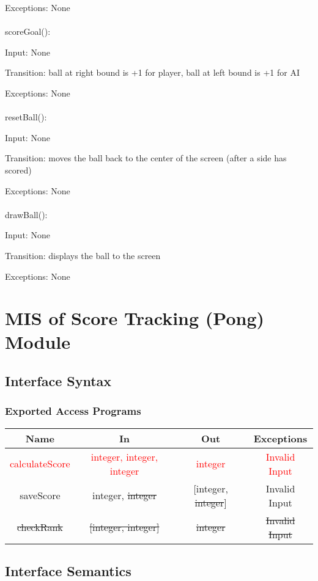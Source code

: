 \documentclass[12pt, titlepage]{article}
\begin{document}
		Exceptions: None\\	
		\\
		scoreGoal():
		
		Input: None
		
		Transition: ball at right bound is +1 for player, ball at left bound is +1 for AI
		
		Exceptions: None\\
		\\
		resetBall():
		
		Input: None
		
		Transition: moves the ball back to the center of the screen (after a side has scored)
		
		Exceptions: None\\
		\\
		drawBall():
	    
		Input: None
		
		Transition: displays the ball to the screen
		
		Exceptions: None

\section{MIS of Score Tracking (Pong) Module}
		\subsection{Interface Syntax}
		\subsubsection{Exported Access Programs}
		\begin{tabular}[pos]{|c|c|c|c|}
			\hline
			\textbf{Name}& \textbf{In} & \textbf{Out} & \textbf{Exceptions} \\ \hline
			\textcolor{red}{calculateScore} & \textcolor{red}{integer, integer, integer} & \textcolor{red}{integer} & \textcolor{red}{Invalid Input} \\ \hline
			saveScore & integer, \sout{integer} & [integer, \sout{integer}] & Invalid Input \\ \hline
			\sout{checkRank} & \sout{[integer, integer]} & \sout{integer} & \sout{Invalid Input} \\ \hline
		\end{tabular}
		
		\subsection{Interface Semantics}
\end{document}
